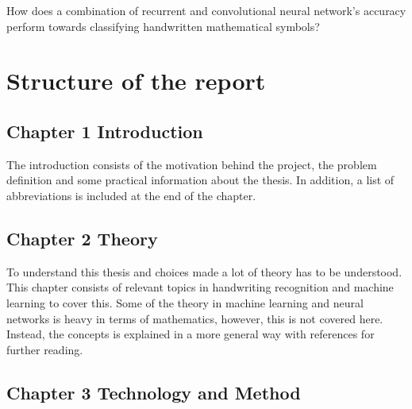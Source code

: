 
How does a combination of recurrent and convolutional neural network's accuracy perform towards classifying handwritten mathematical symbols?






\section{Structure of the report}
\subsection{Chapter 1 Introduction}
The introduction consists of the motivation behind the project, the problem definition and some practical information about the thesis. In addition, a list of abbreviations is included at the end of the chapter.

\subsection{Chapter 2 Theory}
To understand this thesis and choices made a lot of theory has to be understood. This chapter consists of relevant topics in handwriting recognition and machine learning to cover this. Some of the theory in machine learning and neural networks is heavy in terms of mathematics, however, this is not covered here. Instead, the concepts is explained in a more general way with references for further reading.

\subsection{Chapter 3 Technology and Method}

